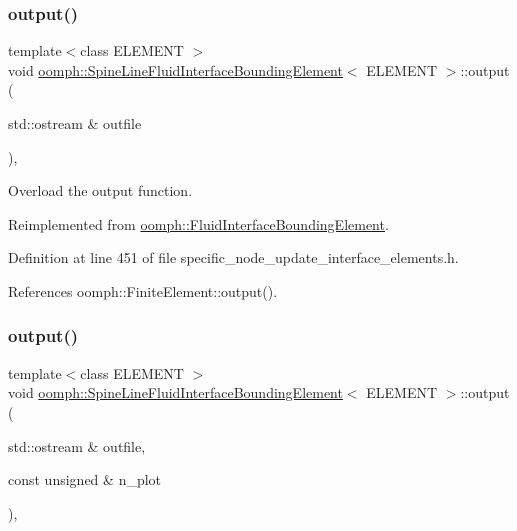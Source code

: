 \subsubsection{\texorpdfstring{output()}{output()}\hspace{0.1cm}{\footnotesize\ttfamily [1/4]}}
{\footnotesize\ttfamily template$<$class E\+L\+E\+M\+E\+NT $>$ \\
void \hyperlink{classoomph_1_1SpineLineFluidInterfaceBoundingElement}{oomph\+::\+Spine\+Line\+Fluid\+Interface\+Bounding\+Element}$<$ E\+L\+E\+M\+E\+NT $>$\+::output (\begin{DoxyParamCaption}\item[{std\+::ostream \&}]{outfile }\end{DoxyParamCaption})\hspace{0.3cm}{\ttfamily [inline]}, {\ttfamily [virtual]}}



Overload the output function. 



Reimplemented from \hyperlink{classoomph_1_1FluidInterfaceBoundingElement_a81adc5ae89ddfa120f587c61b972622f}{oomph\+::\+Fluid\+Interface\+Bounding\+Element}.



Definition at line 451 of file specific\+\_\+node\+\_\+update\+\_\+interface\+\_\+elements.\+h.



References oomph\+::\+Finite\+Element\+::output().

\mbox{\label{classoomph_1_1SpineLineFluidInterfaceBoundingElement_a77acf17ce730f50acd0d850e7460fc4d}} 
\subsubsection{\texorpdfstring{output()}{output()}\hspace{0.1cm}{\footnotesize\ttfamily [2/4]}}
{\footnotesize\ttfamily template$<$class E\+L\+E\+M\+E\+NT $>$ \\
void \hyperlink{classoomph_1_1SpineLineFluidInterfaceBoundingElement}{oomph\+::\+Spine\+Line\+Fluid\+Interface\+Bounding\+Element}$<$ E\+L\+E\+M\+E\+NT $>$\+::output (\begin{DoxyParamCaption}\item[{std\+::ostream \&}]{outfile,  }\item[{const unsigned \&}]{n\+\_\+plot }\end{DoxyParamCaption})\hspace{0.3cm}{\ttfamily [inline]}, {\ttfamily [virtual]}}



